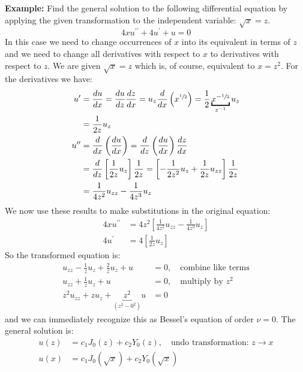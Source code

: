\noindent\textbf{Example:} Find the general solution to the following differential equation by applying the given transformation to the independent variable: $\sqrt{x} = z$.
\begin{equation*}
4xu^{\prime \prime} + 4u^{\prime} + u = 0
\end{equation*}
In this case we need to change occurrences of $x$ into its equivalent in terms of $z$ and we need to change all derivatives with respect to $x$ to derivatives with respect to $z$.  We are given $\sqrt{x}=z$ which is, of course, equivalent to $x = z^2$.  For the derivatives we have:
\begin{align*}
u^{\prime} &= \frac{du}{dx} = \frac{du}{dz}\frac{dz}{dx} = u_z\frac{d}{dx}\left(x^{\sfrac{1}{2}}\right) = \frac{1}{2}\underbracket{x^{-\sfrac{1}{2}}}_{z^{-1}}u_z  \\
&=\frac{1}{2z}u_z \\
u^{\prime \prime} &= \frac{d}{dx}\left(\frac{du}{dx} \right) = \frac{d}{dz}\left(\frac{du}{dx}\right)\frac{dz}{dx} \\
&=\frac{d}{dz}\left[\frac{1}{2z}u_z\right]\frac{1}{2z} = \left[-\frac{1}{2z^2}u_z + \frac{1}{2z}u_{zz} \right] \frac{1}{2z} \\
&=\frac{1}{4z^2}u_{zz}-\frac{1}{4z^3}u_z
\end{align*}
We now use these results to make substitutions in the original equation:
\begin{align*}
4xu^{\prime \prime} &= 4z^2\left[\frac{1}{4z^2}u_{zz}-\frac{1}{4z^3}u_z \right] \\
4u^{\prime} &= 4\left[\frac{1}{2z}u_z\right]
\end{align*}
So the transformed equation is:
\begin{align*}
u_{zz}-\frac{1}{z}u_z + \frac{2}{z}u_z + u &= 0, \ \ \ \text{ combine like terms}\\
u_{zz} + \frac{1}{z}u_z + u &= 0, \ \ \ \text{ multiply by }z^2 \\
z^2u_{zz} + zu_{z} + \underbracket{z^2}_{\left(z^2-0^2\right)}u &= 0
\end{align*}
and we can immediately recognize this as Bessel's equation of order $\nu = 0$. The general solution is:
\begin{align*}
u(z) &= c_1J_0(z) + c_2Y_0(z), \ \ \ \text{ undo transformation: }z\to x \\
u(x) &= c_1J_0(\sqrt{x}) + c_2Y_0(\sqrt{x})
\end{align*}

